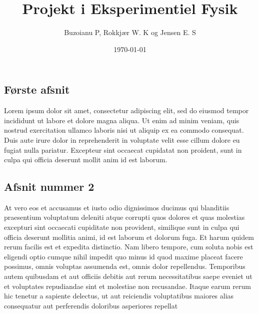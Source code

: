 \documentclass[a4paper,oneside,article]{memoir}
\author{Buzoianu P, Rokkjær W. K og Jensen E. S}
\title{Projekt i Eksperimentiel Fysik}
\date{\today}
\begin{document}
    \maketitle
    \subsection*{Første afsnit}
    Lorem ipsum dolor sit amet, consectetur adipiscing elit, 
    sed do eiusmod tempor incididunt ut labore et dolore magna aliqua. 
    Ut enim ad minim veniam, quis nostrud exercitation ullamco laboris nisi ut aliquip ex ea commodo consequat. 
    Duis aute irure dolor in reprehenderit in voluptate velit esse cillum dolore eu fugiat nulla pariatur. 
    Excepteur sint occaecat cupidatat non proident, sunt in culpa qui officia deserunt mollit anim id est laborum.
  
    \subsection*{Afsnit nummer 2}
    At vero eos et accusamus et iusto odio dignissimos ducimus qui blanditiis praesentium voluptatum deleniti atque corrupti quos dolores et quas molestias excepturi sint occaecati cupiditate non provident, 
    similique sunt in culpa qui officia deserunt mollitia animi, id est laborum et dolorum fuga. 
    Et harum quidem rerum facilis est et expedita distinctio. 
    Nam libero tempore, cum soluta nobis est eligendi optio cumque nihil impedit quo minus id quod maxime placeat facere possimus, 
    omnis voluptas assumenda est, omnis dolor repellendus. 
    Temporibus autem quibusdam et aut officiis debitis aut rerum necessitatibus saepe eveniet ut et voluptates repudiandae sint et molestiae non recusandae. 
    Itaque earum rerum hic tenetur a sapiente delectus, ut aut reiciendis voluptatibus maiores alias consequatur aut perferendis doloribus asperiores repellat
\end{document}
